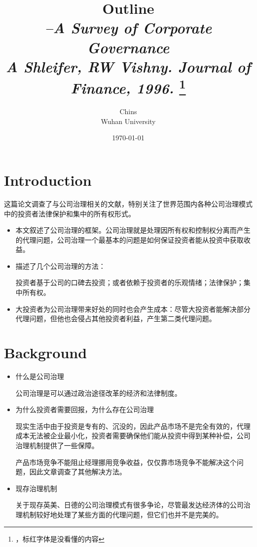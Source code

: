 \documentclass[a4paper]{article}
\title{Outline\\
\textit{--A Survey of Corporate Governance\\
	A Shleifer, RW Vishny. Journal of Finance, 1996. }
\footnote{\citet{shleifer1996} ，标红字体是没看懂的内容}
}
\author{\vspace{1em}
	{\Large Chins}\\
	Wuhan University
}
\date{\today}
\begin{document}
\section{Introduction}
	这篇论文调查了与公司治理相关的文献，特别关注了世界范围内各种公司治理模式中的投资者法律保护和集中的所有权形式。\par 

	\begin{itemize}
		\item 本文叙述了公司治理的框架。公司治理就是处理因所有权和控制权分离而产生的代理问题，公司治理一个最基本的问题是如何保证投资者能从投资中获取收益。
		\item 描述了几个公司治理的方法：\par
		投资者基于公司的口碑去投资；或者依赖于投资者的乐观情绪；法律保护；集中所有权。
		\item 大投资者为公司治理带来好处的同时也会产生成本：尽管大投资者能解决部分代理问题，但他也会侵占其他投资者利益，产生第二类代理问题。
	\end{itemize}

\section{Background}
	\begin{itemize}
		\item 什么是公司治理\par
		公司治理是可以通过政治途径改革的经济和法律制度。
		\item 为什么投资者需要回报，为什么存在公司治理\par
		现实生活中由于投资是专有的、沉没的，因此产品市场不是完全有效的，代理成本无法被企业最小化，投资者需要确保他们能从投资中得到某种补偿，公司治理机制提供了一些保障。\par
		产品市场竞争不能阻止经理挪用竞争收益，仅仅靠市场竞争不能解决这个问题，因此文章调查了其他解决方法。
		\item 现存治理机制\par
		关于现存英美、日德的公司治理模式有很多争论，尽管最发达经济体的公司治理机制较好地处理了某些方面的代理问题，但它们也并不是完美的。
		
	\end{itemize}
\end{document}
